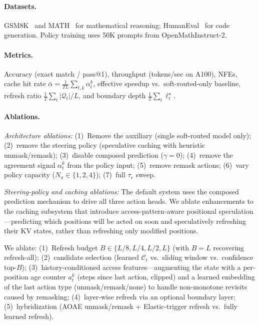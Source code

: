 \documentclass[11pt]{article}
\newcommand{\cQ}{\mathcal{Q}}
\newcommand{\cC}{\mathcal{C}}
\begin{document}
\paragraph{Datasets.}
GSM8K~\cite{cobbe2021gsm8k} and MATH~\cite{hendrycks2021math} for mathematical reasoning; HumanEval~\cite{chen2021humaneval} for code generation.
Policy training uses 50K prompts from OpenMathInstruct-2.

\paragraph{Metrics.}
Accuracy (exact match / pass@1), throughput (tokens/sec on A100), NFEs, cache hit rate $\bar{\alpha} = \frac{1}{TL}\sum_{t,k} \alpha_t^k$, effective speedup vs.\ soft-routed-only baseline, refresh ratio $\frac{1}{T}\sum_t |\cQ_t|/L$, and boundary depth $\frac{1}{T}\sum_t \ell_t^\star$.

\paragraph{Ablations.}
\emph{Architecture ablations:}
(1)~Remove the auxiliary (single soft-routed model only);
(2)~remove the steering policy (speculative caching with heuristic unmask/remask);
(3)~disable composed prediction ($\gamma = 0$);
(4)~remove the agreement signal $\alpha_t^k$ from the policy input;
(5)~remove remask actions;
(6)~vary policy capacity ($N_\pi \in \{1, 2, 4\}$);
(7)~full $\tau_r$ sweep.

\emph{Steering-policy and caching ablations:}
The default system uses the composed prediction mechanism to drive all three action heads.
We ablate enhancements to the caching subsystem that introduce access-pattern-aware positional speculation---predicting which positions will be acted on soon and speculatively refreshing their KV states, rather than refreshing only modified positions.

We ablate:
(1)~Refresh budget $B \in \{L/8, L/4, L/2, L\}$ (with $B{=}L$ recovering refresh-all);
(2)~candidate selection (learned $\cC_t$ vs.\ sliding window vs.\ confidence top-$B$);
(3)~history-conditioned access features---augmenting the state with a per-position age counter $a_t^k$ (steps since last action, clipped) and a learned embedding of the last action type (unmask/remask/none) to handle non-monotone revisits caused by remasking;
(4)~layer-wise refresh via an optional boundary layer;
(5)~hybridization (AOAE unmask/remask + Elastic-trigger refresh vs.\ fully learned refresh).
\end{document}
